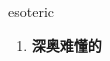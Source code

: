 
\begin{frame}
{\huge esoteric}
\begin{center}
\begin{enumerate}\Large
  \item \textbf{深奥难懂的}
\end{enumerate}
\end{center}
\end{frame}
